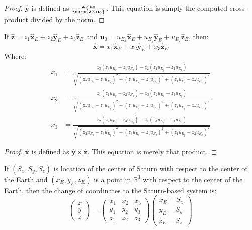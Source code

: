 \documentclass[crop=false,class=book,oneside]{standalone}
\begin{document}
            \begin{proof}
            $\hat{\mathbf{y}}$ is defined as $\frac{\hat{\mathbf{z}}\times \mathbf{u}_{0}}{\norm{\hat{\mathbf{z}}\times \mathbf{u}_{0}}}$. This equation is simply the computed cross-product divided by the norm.
            \end{proof}
            \begin{theorem}
            If $\hat{\mathbf{z}} = z_1\hat{\mathbf{x}}_{E}+z_2\hat{\mathbf{y}}_{E}+z_3\hat{\mathbf{z}}_{E}$ and $\mathbf{u}_{0} = u_{E_{x}}\hat{\mathbf{x}}_{E}+u_{E_{y}}\hat{\mathbf{y}}_{E}+u_{E_{z}}\hat{\mathbf{z}}_{E}$, then:
            \begin{equation*}
            \hat{\mathbf{x}} = x_1 \hat{\mathbf{x}}_{E}+x_2\hat{\mathbf{y}}_{E}+x_3\hat{\mathbf{z}}_{E}
            \end{equation*}
            Where:
            \begin{align*}
            x_1 &= \frac{z_3(z_{3}u_{E_{x}}-z_1u_{E_{z}})-z_2(z_1u_{E_{y}}-z_2u_{E_{x}})}{\sqrt{(z_2u_{E_{z}}-z_3u_{E_{y}})^2+(z_3u_{E_{x}}-z_1u_{E_{z}})^2+(z_1u_{E_{y}}-z_2u_{E_{x}})^2}}\\
            x_2 &= \frac{z_1(z_{1}u_{E_{y}}-z_{2}u_{E_{x}})-z_{3}(z_{2}u_{E_{z}}-z_{3}u_{E_{y}})}{\sqrt{(z_2u_{E_{z}}-z_3u_{E_{y}})^2+(z_3u_{E_{x}}-z_1u_{E_{z}})^2+(z_1u_{E_{y}}-z_2u_{E_{x}})^2}}\\
            x_3 &= \frac{z_2(z_2u_{E_{z}}-z_3u_{E_{y}})-z_1(z_{3}u_{E_{x}}-z_{1}u_{E_{z}})}{\sqrt{(z_2u_{E_{z}}-z_3u_{E_{y}})^2+(z_3u_{E_{x}}-z_1u_{E_{z}})^2+(z_1u_{E_{y}}-z_2u_{E_{x}})^2}}
            \end{align*}
            \end{theorem}
            \begin{proof}
            $\hat{\mathbf{x}}$ is defined as $\hat{\mathbf{y}}\times \hat{\mathbf{z}}$. This equation is merely that product.
            \end{proof}
            \begin{theorem}
            If $(S_x,S_y,S_z)$ is location of the center of Saturn with respect to the center of the Earth and $(x_{E},y_{E},z_{E})$ is a point in $\mathbb{R}^3$ with respect to the center of the Earth, then the change of coordinates to the Saturn-based system is:
            \begin{equation*}
            \begin{pmatrix} x\\y\\z \end{pmatrix} = \begin{pmatrix} x_1 & x_2 & x_3 \\ y_1 & y_2 & y_3 \\ z_1 & z_2 & z_3 \end{pmatrix} \begin{pmatrix} x_{E}-S_{x} \\ y_{E}-S_{y} \\ z_{E} - S_{z}\end{pmatrix}
            \end{equation*}
            \end{theorem}
\end{document}
